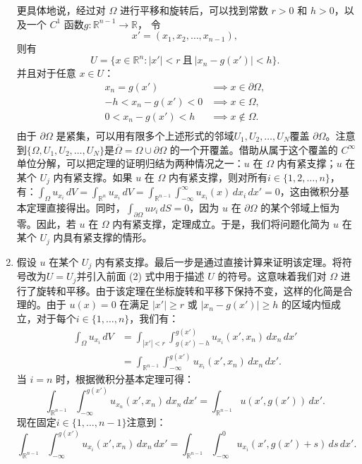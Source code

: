 \begin{enumerate}
更具体地说，经过对 $\displaystyle \Omega$ 进行平移和旋转后，可以找到常数 $\displaystyle r > 0$ 和 $\displaystyle h > 0$，以及一个 $\displaystyle C^{1}$ 函数$g:\mathbb{R}^{n-1} \to \mathbb{R}$，
令
$$
x' = (x_{1}, x_{2}, \dots, x_{n-1}),~
$$
则有
$$
U = \{x \in \mathbb{R}^n : |x'| < r \ \text{且}\ |x_n - g(x')| < h\}.~
$$
并且对于任意 $\displaystyle x \in U$：
$$
\begin{aligned}
x_n = g(x') &\implies x \in \partial \Omega,\\
-h < x_n - g(x') < 0 &\implies x \in \Omega,\\
0 < x_n - g(x') < h &\implies x \notin \Omega.\\
\end{aligned}~
$$
由于 $\partial \Omega$ 是紧集，可以用有限多个上述形式的邻域$U_1, U_2, \dots, U_N$覆盖 $\partial \Omega$。注意到$\{\Omega, U_1, U_2, \dots, U_N\}$是$\overline{\Omega} = \Omega \cup \partial \Omega$
的一个开覆盖。借助从属于这个覆盖的 $C^{\infty}$ 单位分解，可以把定理的证明归结为两种情况之一：$u$ 在 $\Omega$ 内有紧支撑；$u$ 在某个 $U_j$ 内有紧支撑。如果 $u$ 在 $\Omega$ 内有紧支撑，则对所有$i \in \{1, 2, \dots, n\}$，有：$\int_{\Omega} u_{x_i} \, dV= \int_{\mathbb{R}^n} u_{x_i} \, dV= \int_{\mathbb{R}^{n-1}} \int_{-\infty}^{\infty} u_{x_i}(x) \, dx_i \, dx' = 0$，这由微积分基本定理直接得出。同时，$\int_{\partial \Omega} u \nu_i \, dS = 0$，因为 $u$ 在 $\partial \Omega$ 的某个邻域上恒为零。因此，若 $u$ 在 $\Omega$ 内有紧支撑，定理成立。于是，我们将问题化简为 $u$ 在某个 $U_j$ 内具有紧支撑的情形。
\item 假设 $u$ 在某个 $U_j$ 内有紧支撑。最后一步是通过直接计算来证明该定理。将符号改为$U = U_j$并引入前面 (2) 式中用于描述 $U$ 的符号。这意味着我们对 $\Omega$ 进行了旋转和平移。由于该定理在坐标旋转和平移下保持不变，这样的化简是合理的。由于 $u(x) = 0$ 在满足 $|x'| \ge r$ 或 $|x_n - g(x')| \ge h$ 的区域内恒成立，对于每个$i \in \{1, \dots, n\}$，我们有：
$$
\begin{aligned}
\int_{\Omega} u_{x_i} \, dV
&= \int_{|x'| < r} \int_{g(x') - h}^{g(x')} u_{x_i}(x', x_n) \, dx_n \, dx' \\  
&= \int_{\mathbb{R}^{n-1}} \int_{-\infty}^{g(x')} u_{x_i}(x', x_n) \, dx_n \, dx'.
\end{aligned}~
$$
当 $i = n$ 时，根据微积分基本定理可得：
$$
\int_{\mathbb{R}^{n-1}} \int_{-\infty}^{g(x')} u_{x_n}(x', x_n) \, dx_n \, dx'  
= \int_{\mathbb{R}^{n-1}} u(x', g(x')) \, dx'.~
$$
现在固定$i \in \{1, \dots, n-1\}$注意到：
$$
\int_{\mathbb{R}^{n-1}} \int_{-\infty}^{g(x')} u_{x_i}(x', x_n) \, dx_n \, dx'  
= \int_{\mathbb{R}^{n-1}} \int_{-\infty}^{0} u_{x_i}(x', g(x') + s) \, ds \, dx'.~
$$
\end{enumerate}
